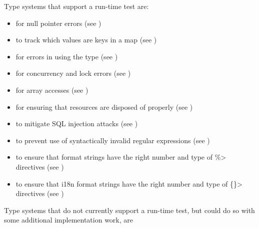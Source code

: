 Type systems that support a run-time test are:
\begin{itemize}
\item
   for null pointer errors
  (see )
\item
   to track which values are
  keys in a map (see )
\item
   for errors in using the
   type (see
  )
\item
   for concurrency and lock errors
  (see )
\item
   for array accesses
  (see )
\item
   for ensuring that resources are disposed of properly
  (see )
\item
   to mitigate SQL injection
  attacks
  (see )
\item
   to prevent use of syntactically
  invalid regular expressions (see )
\item
   to ensure that format
  strings have the right number and type of \<\%> directives (see
  )
\item
  to ensure that i18n format strings have the right number and type of
  \<\{\}> directives (see )
\end{itemize}


Type systems that do not currently support a run-time test, but could do so with some
additional implementation work, are

